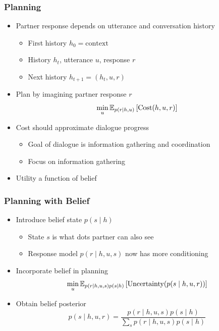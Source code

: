 \documentclass{beamer}
\begin{document}
\begin{frame}
\frametitle{Planning}
\begin{itemize}
\item Partner response depends on utterance and conversation history
    \begin{itemize}
    \item First history $h_0 = \text{context}$
    \item History $h_t$, utterance $u$, response $r$
    \item Next history $h_{t+1} = (h_t, u, r)$
    \end{itemize}
\begin{center}
\end{center}
\item Plan by imagining partner response $r$
$$\min_{u} \mathbb{E}_{p(r \mid h, u)}\left[\text{Cost}(h, u, r)\right]$$
\item Cost should approximate dialogue progress
    \begin{itemize}
    \item Goal of dialogue is information gathering and coordination
    \item Focus on information gathering
    \end{itemize}
\item Utility a function of belief
\end{itemize}
\end{frame}

\begin{frame}
\frametitle{Planning with Belief}
\begin{itemize}
\item Introduce belief state $p(s \mid h)$
    \begin{itemize}
    \item State $s$ is what dots partner can also see
    \item Response model $p(r \mid h,u,s)$ now has more conditioning
    \end{itemize}
\begin{center}
\end{center}
\item Incorporate belief in planning
$$\min_{u} \mathbb{E}_{p(r \mid h, u, s)p(s \mid h)}\left[\text{Uncertainty}(p(s \mid h, u, r))\right]$$
\item Obtain belief posterior
$$p(s \mid h, u, r) = \frac{p(r \mid h, u, s)p(s \mid h)}{\sum_s p(r\mid h,u,s)p(s \mid h)}$$
\end{itemize}
\end{frame}
\end{document}
